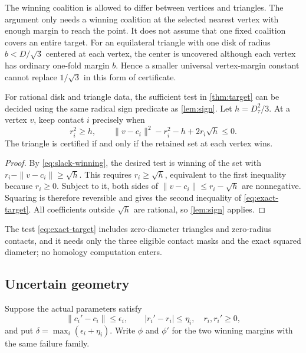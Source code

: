 The winning coalition is allowed to differ between vertices and triangles. The argument only needs a winning coalition at the selected nearest vertex with enough margin to reach the point. It does not assume that one fixed coalition covers an entire target. For an equilateral triangle with one disk of radius $b<D/\sqrt3$ centered at each vertex, the center is uncovered although each vertex has ordinary one-fold margin $b$. Hence a smaller universal vertex-margin constant cannot replace $1/\sqrt3$ in this form of certificate.

\begin{proposition}\label{prop:exact-target}
For rational disk and triangle data, the sufficient test in \cref{thm:target} can be decided using the same radical sign predicate as \cref{lem:sign}. Let $h=D_\tau^2/3$. At a vertex $v$, keep contact $i$ precisely when
\begin{equation}\label{eq:exact-target}
r_i^2\ge h,\qquad
\|v-c_i\|^2-r_i^2-h+2r_i\sqrt h\le0.
\end{equation}
The triangle is certified if and only if the retained set at each vertex wins.
\end{proposition}
\begin{proof}
By \cref{eq:slack-winning}, the desired test is winning of the set with $r_i-\|v-c_i\|\ge\sqrt h$. This requires $r_i\ge\sqrt h$, equivalent to the first inequality because $r_i\ge0$. Subject to it, both sides of $\|v-c_i\|\le r_i-\sqrt h$ are nonnegative. Squaring is therefore reversible and gives the second inequality of \cref{eq:exact-target}. All coefficients outside $\sqrt h$ are rational, so \cref{lem:sign} applies.
\end{proof}

The test \cref{eq:exact-target} includes zero-diameter triangles and zero-radius contacts, and it needs only the three eligible contact masks and the exact squared diameter; no homology computation enters.

\subsection{Uncertain geometry}
Suppose the actual parameters satisfy
\[
\|c_i'-c_i\|\le\epsilon_i,\qquad |r_i'-r_i|\le\eta_i,
\quad r_i,r_i'\ge0,
\]
and put $\delta=\max_i(\epsilon_i+\eta_i)$. Write $\phi$ and $\phi'$ for the two winning margins with the same failure family.

